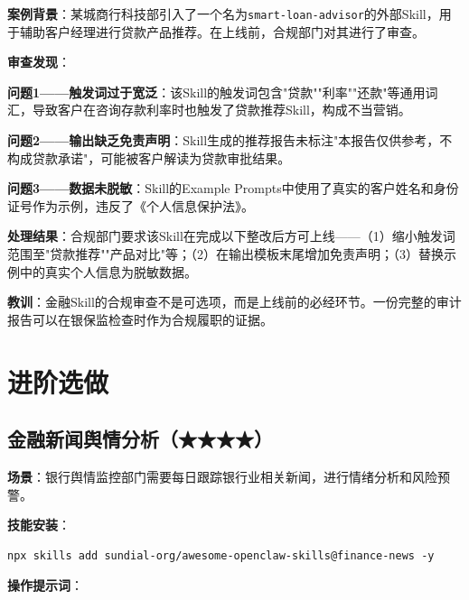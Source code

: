 \begin{casebox}[金融Skill的银保监合规审查案例]
\textbf{案例背景}：某城商行科技部引入了一个名为\texttt{smart-loan-advisor}的外部Skill，用于辅助客户经理进行贷款产品推荐。在上线前，合规部门对其进行了审查。

\textbf{审查发现}：

\textbf{问题1——触发词过于宽泛}：该Skill的触发词包含"贷款""利率""还款"等通用词汇，导致客户在咨询存款利率时也触发了贷款推荐Skill，构成不当营销。

\textbf{问题2——输出缺乏免责声明}：Skill生成的推荐报告未标注"本报告仅供参考，不构成贷款承诺"，可能被客户解读为贷款审批结果。

\textbf{问题3——数据未脱敏}：Skill的Example Prompts中使用了真实的客户姓名和身份证号作为示例，违反了《个人信息保护法》。

\textbf{处理结果}：合规部门要求该Skill在完成以下整改后方可上线——（1）缩小触发词范围至"贷款推荐""产品对比"等；（2）在输出模板末尾增加免责声明；（3）替换示例中的真实个人信息为脱敏数据。

\textbf{教训}：金融Skill的合规审查不是可选项，而是上线前的必经环节。一份完整的审计报告可以在银保监检查时作为合规履职的证据。
\end{casebox}

\section{进阶选做}

\subsection{金融新闻舆情分析（★★★★）}

\textbf{场景}：银行舆情监控部门需要每日跟踪银行业相关新闻，进行情绪分析和风险预警。

\textbf{技能安装}：

\begin{lstlisting}[style=shell]
npx skills add sundial-org/awesome-openclaw-skills@finance-news -y
\end{lstlisting}

\textbf{操作提示词}：

